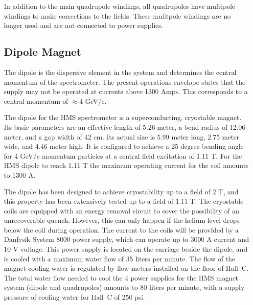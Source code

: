 {In addition to the main quadrupole windings, all quadrupoles have multipole
windings to make corrections to the fields.  These mulitpole windings
are no longer used and are not connected to power supplies.


\newpage
\subsection{Dipole Magnet }

The dipole is the dispersive element in the system and 
determines the central momentum of the spectrometer.
The present operations envelope states that the supply may not be
operated at currents above 1300 Amps. This corresponds to a central
momentum of $\approx$4 GeV/c.

The dipole for the HMS spectrometer is a superconducting, cryostable magnet.
Its basic parameters are an effective length of 5.26 meter,
a bend radius of 12.06 meter, and a gap width of 42 cm.
Its actual size is 5.99 meter long, 2.75 meter wide, and 4.46 meter high.
It is configured to achieve a 25 degree bending angle for 4 GeV/c momentum
particles at a central field excitation of 1.11 T.
For the HMS dipole to reach 1.11 T the maximum operating current for the coil
amounts to 1300 A.

The dipole has been designed to achieve cryostability up to a field of 2 T,
and this property has been extensively tested up to a field of 1.11 T.
The cryostable coils are equipped with an energy removal circuit to cover
the possibility of an unrecoverable quench. \cite{bi:hms2}
However, this can only happen
if the helium level drops below the coil during operation.
The current to the coils will be provided by a Danfysik System 8000 power
supply, which can operate up to 3000 A current and 10 V voltage.
This power supply is located on the carriage beside the dipole, and
is cooled with a maximum water flow of 35 liters per minute.
The flow of the magnet cooling water is regulated by flow meters installed
on the floor of Hall~C. The total water flow needed to cool the 4 power
supplies for the HMS magnet system (dipole and quadrupoles) amounts
to 80 liters per minute, with a supply pressure of cooling water for
Hall~C of 250 psi.


}
